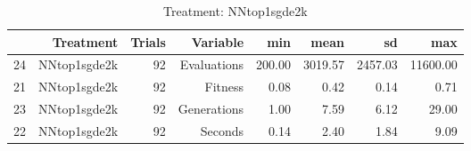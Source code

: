 \begin{table}[ht]
\centering
\begin{tabular}{rrrrrrrr}
  \hline
 & Treatment & Trials & Variable & min & mean & sd & max \\ 
  \hline
24 & NNtop1sgde2k &  92 & Evaluations & 200.00 & 3019.57 & 2457.03 & 11600.00 \\ 
  21 & NNtop1sgde2k &  92 & Fitness & 0.08 & 0.42 & 0.14 & 0.71 \\ 
  23 & NNtop1sgde2k &  92 & Generations & 1.00 & 7.59 & 6.12 & 29.00 \\ 
  22 & NNtop1sgde2k &  92 & Seconds & 0.14 & 2.40 & 1.84 & 9.09 \\ 
   \hline
\end{tabular}
\caption{Treatment: NNtop1sgde2k} 
\end{table}
